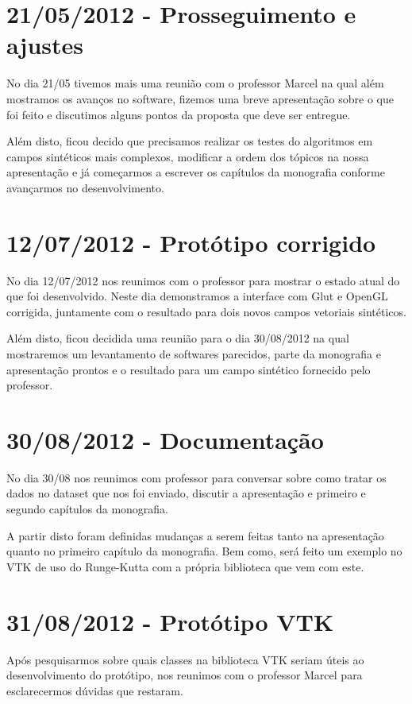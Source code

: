 \documentclass[a4paper,11pt]{report}
\begin{document}
\section{21/05/2012 - Prosseguimento e ajustes}
No dia 21/05 tivemos mais uma reunião com o professor Marcel na qual além mostramos os avanços no software, fizemos uma breve apresentação sobre o que foi feito e discutimos alguns pontos da proposta que deve ser entregue.

Além disto, ficou decido que precisamos realizar os testes do algoritmos em campos sintéticos mais complexos, modificar a ordem dos tópicos na nossa apresentação e já começarmos a escrever os capítulos da monografia conforme avançarmos no desenvolvimento.

\section{12/07/2012 - Protótipo corrigido}
No dia 12/07/2012 nos reunimos com o professor para mostrar o estado atual do que foi desenvolvido. Neste dia demonstramos a interface com Glut e OpenGL corrigida, juntamente com o resultado para dois novos campos vetoriais sintéticos.

Além disto, ficou decidida uma reunião para o dia 30/08/2012 na qual mostraremos um levantamento de softwares parecidos, parte da monografia e apresentação prontos e o resultado para um campo sintético fornecido pelo professor.

\section{30/08/2012 - Documentação}
No dia 30/08 nos reunimos com professor para conversar sobre como tratar os dados no dataset que nos foi enviado, discutir a apresentação e primeiro e segundo capítulos da monografia.

A partir disto foram definidas mudanças a serem feitas tanto na apresentação quanto no primeiro capítulo da monografia. Bem como, será feito um exemplo no VTK de uso do Runge-Kutta com a própria biblioteca que vem com este.

\section{31/08/2012 - Protótipo VTK}
Após pesquisarmos sobre quais classes na biblioteca VTK seriam úteis ao desenvolvimento do protótipo, nos reunimos com o professor Marcel para esclarecermos dúvidas que restaram.
\end{document}
